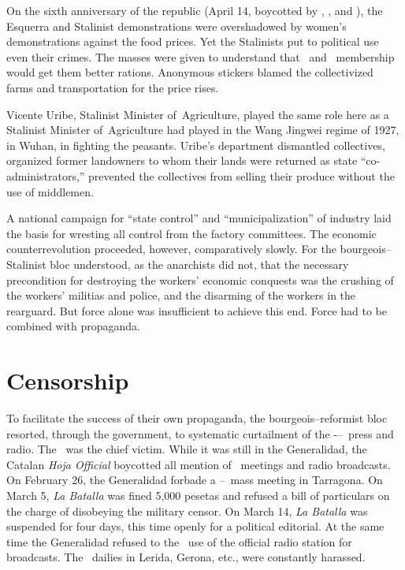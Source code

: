 On the sixth anniversary of the republic (April 14, boycotted by \FAI\kn, \CNT\kn, and \POUM), the Esquerra and Stalinist demonstrations were overshadowed by women’s demonstrations against the food prices. Yet the Stalinists put to political use even their crimes. The masses were given to understand that \PSUC\ and \UGT\ membership would get them better rations. Anonymous stickers blamed the collectivized farms and transportation for the price rises.

Vicente Uribe, Stalinist Minister of~Agriculture, played the same role here as a Stalinist Minister of~Agriculture had played in the Wang Jingwei regime of 1927, in Wuhan, in fighting the peasants. Uribe’s department dismantled collectives, organized former landowners to whom their lands were returned as state ``co-admin\-istrat\-ors,'' prevented the collectives from selling their produce without the use of middlemen.

A national campaign for ``state control'' and ``municipalization'' of industry laid the basis for wresting all control from the factory committees. The economic counterrevolution proceeded, however, comparatively slowly. For the bourgeois--Stalinist bloc understood, as the anarchists did not, that the necessary precondition for destroying the workers’ economic conquests was the crushing of the workers’ militias and police, and the disarming of the workers in the rearguard. But force alone was insufficient to achieve this end. Force had to be combined with propaganda.

\section{Censorship}

To facilitate the success of their own propaganda, the bourgeois--reformist bloc resorted, through the government, to systematic curtailment of the \CNT-\FAI--\POUM\ press and radio. The \POUM\ was the chief victim. While it was still in the Generalidad, the Catalan \emph{Hoja Official} boycotted all mention of \POUM\ meetings and radio broadcasts. On February 26, the Generalidad forbade a \CNT--\POUM\ mass meeting in Tarragona. On March 5, \emph{La Batalla} was fined 5,000 pesetas and refused a bill of particulars on the charge of disobeying the military censor. On March 14, \emph{La Batalla} was suspended for four days, this time openly for a political editorial. At the same time the Generalidad refused to the \POUM\ use of the official radio station for broadcasts. The \POUM\ dailies in Lerida, Gerona, etc., were constantly harassed.


